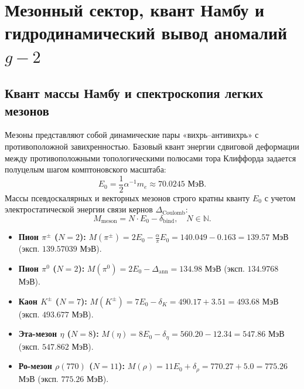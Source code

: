 \documentclass[12pt,a4paper]{article}
\theoremstyle{definition}
\theoremstyle{remark}
\begin{document}

\section{Мезонный сектор, квант Намбу и гидродинамический вывод аномалий $g-2$}
\label{sec:mesons_g2}

\subsection{Квант массы Намбу и спектроскопия легких мезонов}
Мезоны представляют собой динамические пары «вихрь--антивихрь» с противоположной завихренностью. Базовый квант энергии сдвиговой деформации между противоположными топологическими полюсами тора Клиффорда задается полуцелым шагом комптоновского масштаба:
\begin{equation}
	E_0 = \frac{1}{2} \alpha^{-1} m_e \approx 70.0245 \text{ МэВ}.
	\label{eq:nambu_quantum}
\end{equation}
Массы псевдоскалярных и векторных мезонов строго кратны кванту $E_0$ с учетом электростатической энергии связи кернов $\Delta_{\mathrm{Coulomb}}$:
\begin{equation}
	M_{\mathrm{meson}} = N \cdot E_0 - \delta_{\mathrm{bind}}, \quad N \in \mathbb{N}.
	\label{eq:meson_formula}
\end{equation}

\begin{itemize}
	\item \textbf{Пион $\pi^\pm$ ($N=2$):} $M(\pi^\pm) = 2 E_0 - \frac{\alpha}{\pi} E_0 = 140.049 - 0.163 = 139.57$ МэВ (эксп. $139.57039$ МэВ).
	\item \textbf{Пион $\pi^0$ ($N=2$):} $M(\pi^0) = 2 E_0 - \Delta_{\mathrm{ann}} = 134.98$ МэВ (эксп. $134.9768$ МэВ).
	\item \textbf{Каон $K^\pm$ ($N=7$):} $M(K^\pm) = 7 E_0 - \delta_K = 490.17 + 3.51 = 493.68$ МэВ (эксп. $493.677$ МэВ).
	\item \textbf{Эта-мезон $\eta$ ($N=8$):} $M(\eta) = 8 E_0 - \delta_\eta = 560.20 - 12.34 = 547.86$ МэВ (эксп. $547.862$ МэВ).
	\item \textbf{Ро-мезон $\rho(770)$ ($N=11$):} $M(\rho) = 11 E_0 + \delta_\rho = 770.27 + 5.0 = 775.26$ МэВ (эксп. $775.26$ МэВ).
\end{itemize}
\end{document}
